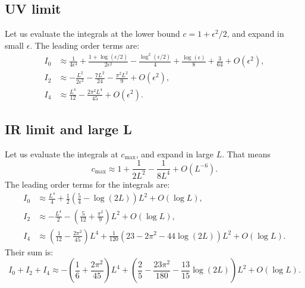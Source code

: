 \subsection{UV limit}\label{sec:UVlimit}
Let us evaluate the integrals at the lower bound $c = 1 + \epsilon^2/2$, and expand in small $\epsilon$. The leading order terms are:
\begin{align}
 I_0 &\approx \frac{1}{4 \epsilon ^4} +\frac{1+\log \left(\epsilon/2\right)}{2 \epsilon ^2}-\frac{ \log ^2\left(\epsilon/2\right)}{4}+\frac{\log (\epsilon )}{8} + \frac{3}{64} + O(\epsilon^2),\\
%     
I_2 & \approx -\frac{L^2}{2 \epsilon^2}-\frac{7 L^2}{24}-\frac{\pi ^2 L^2}{9} + O(\epsilon^2),\\
%    
 I_4 & \approx \frac{L^4}{12}-\frac{2 \pi ^2 L^4}{45} + O(\epsilon^2). 
\end{align}


\subsection{IR limit and large L} \label{sec:IRlimit}
Let us evaluate the integrals at $c_\text{max}$, and expand in large $L$. That means 
\begin{equation}
 c_\text{max} \approx 1 + \frac{1}{2 L^2} - \frac{1}{8 L^4} + O(L^{-6}).
\end{equation}
The leading order terms for the integrals are:
\begin{align}
 I_0 &\approx \frac{L^4}{4}+\frac{1}{2} \left(\frac{5}{4} - \log(2 L)\right) L^2 + O(\log L),\\
%     
I_2 & \approx -\frac{L^4}{2} -\left(\frac{5}{12}+\frac{\pi^2}{9}\right) L^2 + O(\log L),\\
%    
 I_4 & \approx \left(\frac{1}{12}-\frac{2 \pi ^2}{45}\right) L^4+ \frac{1}{120} \left(23 -2 \pi^2 - 44 \log(2 L) \right)L^2+ O(\log L). 
\end{align}
Their sum is:
\begin{equation}\label{eq:IatUV}
 I_0+I_2+I_4 \approx -\left(\frac{1}{6}+\frac{2 \pi ^2}{45}\right) L^4
             +\left(\frac{2}{5}-\frac{23 \pi ^2}{180}-\frac{ 13}{15} \log(2 L)\right)L^2 + O(\log L).
\end{equation}


